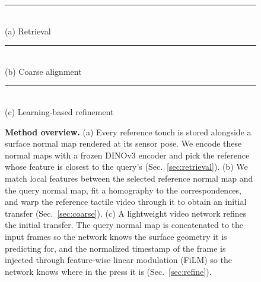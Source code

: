 \begin{figure}[t]
  \centering
  \rule{\linewidth}{2.6cm}\\[0.4em]%
  {\small (a) Retrieval}\\[0.9em]
  \rule{\linewidth}{2.6cm}\\[0.4em]%
  {\small (b) Coarse alignment}\\[0.9em]
  \rule{\linewidth}{2.6cm}\\[0.4em]%
  {\small (c) Learning-based refinement}
  \caption{\textbf{Method overview.} (a) Every reference touch is stored alongside a surface
    normal map rendered at its sensor pose. We encode these normal maps with a frozen DINOv3
    encoder and pick the reference whose feature is closest to the query's
    (Sec.~\ref{sec:retrieval}). (b) We match local features between the selected reference normal
    map and the query normal map, fit a homography to the correspondences, and warp the reference
    tactile video through it to obtain an initial transfer (Sec.~\ref{sec:coarse}). (c) A
    lightweight video network refines the initial transfer. The query normal map is concatenated
    to the input frames so the network knows the surface geometry it is predicting for, and the
    normalized timestamp of the frame is injected through feature-wise linear modulation (FiLM) so
    the network knows where in the press it is (Sec.~\ref{sec:refine}).}
  \label{fig:method}
\end{figure}

